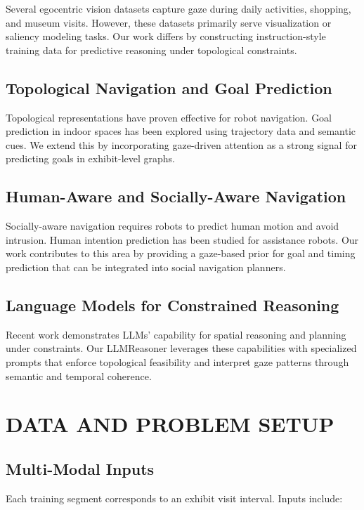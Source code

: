 \documentclass[letterpaper]{article}
\begin{document}
Several egocentric vision datasets capture gaze during daily activities, shopping, and museum visits. However, these datasets primarily serve visualization or saliency modeling tasks. Our work differs by constructing instruction-style training data for predictive reasoning under topological constraints.

\subsection{Topological Navigation and Goal Prediction}

Topological representations have proven effective for robot navigation. Goal prediction in indoor spaces has been explored using trajectory data and semantic cues. We extend this by incorporating gaze-driven attention as a strong signal for predicting goals in exhibit-level graphs.

\subsection{Human-Aware and Socially-Aware Navigation}

Socially-aware navigation requires robots to predict human motion and avoid intrusion. Human intention prediction has been studied for assistance robots. Our work contributes to this area by providing a gaze-based prior for goal and timing prediction that can be integrated into social navigation planners.

\subsection{Language Models for Constrained Reasoning}

Recent work demonstrates LLMs' capability for spatial reasoning and planning under constraints. Our LLMReasoner leverages these capabilities with specialized prompts that enforce topological feasibility and interpret gaze patterns through semantic and temporal coherence.

\section{DATA AND PROBLEM SETUP}

\subsection{Multi-Modal Inputs}

Each training segment corresponds to an exhibit visit interval. Inputs include:
\end{document}
